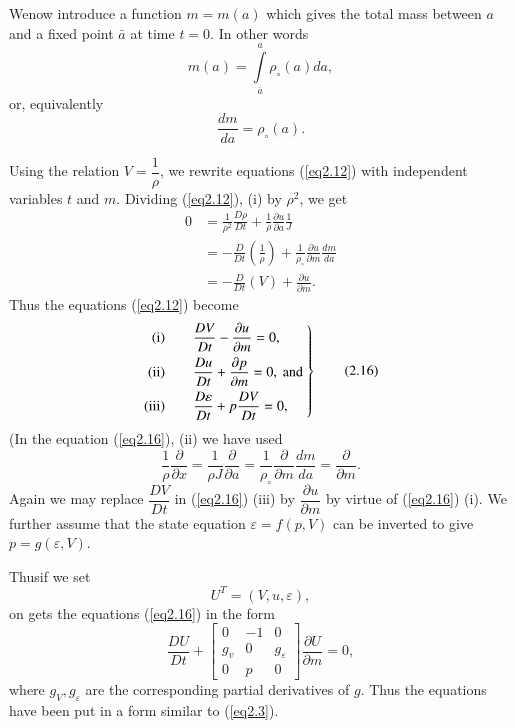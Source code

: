 We\pageoriginale now introduce a function $m = m(a)$ which gives the
total mass between $a$ and a fixed point $\bar{a}$ at time $t=0$. In
other words
\begin{equation*}
m(a) = \int\limits^a_{\bar{a}} \rho_\circ(a) da, \tag{2.14}\label{eq2.14}
\end{equation*}
or, equivalently
\begin{equation*}
\frac{dm}{da} = \rho_\circ(a). \tag{2.15}\label{eq2.15}
\end{equation*}

Using the relation $V =\dfrac{1}{\rho}$, we rewrite equations
(\ref{eq2.12}) with independent variables $t$ and $m$. Dividing (\ref{eq2.12}), (i) by
$\rho^2$, we get
\begin{align*}
0 & = \frac{1}{\rho^2} \frac{D\rho}{ Dt} + \frac{1}{\rho}
\frac{\partial u}{\partial a} \frac{1}{J}\\
& = - \frac{D}{Dt} \left(\frac{1}{\rho}\right) + \frac{1}{\rho_\circ}
\frac{\partial u}{\partial m} \frac{dm}{da}\\
& = - \frac{D}{Dt} (V) + \frac{\partial u}{\partial m}.
\end{align*}
Thus the equations (\ref{eq2.12}) become
\begin{equation*}
\left.
\begin{aligned}
{\rm (i)} \qquad & \frac{DV}{Dt} -  \frac{\partial u}{\partial m} = 0,\\
{\rm (ii)} \qquad & \frac{D u}{Dt} + \frac{\partial p}{\partial m} =
0, \text{ and }\\
{\rm (iii)} \qquad & \frac{D\varepsilon}{Dt} +p \frac{DV}{Dt} =0,
\end{aligned} \right\}
\tag{2.16}\label{eq2.16}
\end{equation*}
(In the equation (\ref{eq2.16}), (ii) we have used
$$
\frac{1}{\rho} \frac{\partial}{\partial x } = \frac{1}{\rho J}
\frac{\partial }{\partial a} = \frac{1}{\rho_\circ}
\frac{\partial}{\partial m} \frac{dm}{da} = \frac{\partial}{\partial m}.
$$
Again we may replace $\dfrac{DV}{Dt}$ in (\ref{eq2.16}) (iii) by
$\dfrac{\partial u}{\partial m}$ by virtue of (\ref{eq2.16}) (i). We further 
assume that the state equation $\varepsilon = f(p,V)$ can be inverted
to give $p = g (\varepsilon, V)$. 

Thus\pageoriginale if we set
\begin{equation*}
U^T = (V, u, \varepsilon),
\tag{2.17}\label{eq2.17}
\end{equation*}
on gets the equations (\ref{eq2.16}) in the form 
\begin{equation*}
\frac{DU}{Dt}+
\begin{bmatrix}
0 & -1 & 0\\
g_v & 0 & g_\varepsilon\\
0 & p & 0
\end{bmatrix} \frac{\partial U}{\partial m} = 0, \tag{2.18}\label{eq2.18}
\end{equation*}
where $g_V, g_\varepsilon$ are the corresponding partial derivatives
of $g$. Thus the equations have been put in a form similar to (\ref{eq2.3}).

